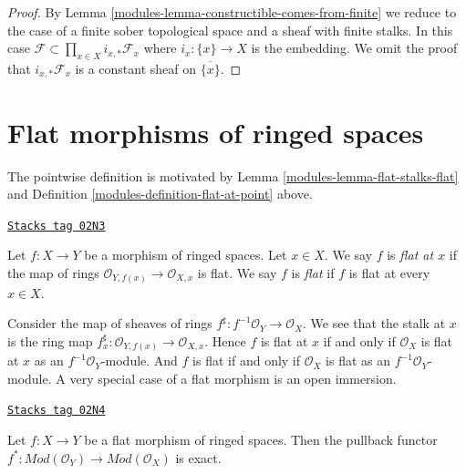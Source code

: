 \begin{proof}

By Lemma \ref{modules-lemma-constructible-comes-from-finite}
we reduce to the case of a finite sober topological space
and a sheaf with finite stalks.
In this case $\mathcal{F} \subset \prod_{x \in X} i_{x, *}\mathcal{F}_x$
where $i_x : \{x\} \to X$ is the embedding. We omit the proof
that $i_{x, *}\mathcal{F}_x$ is a constant sheaf on $\overline{\{x\}}$.
\end{proof}

\section{Flat morphisms of ringed spaces}
\label{modules-section-flat-morphisms}
The pointwise definition is motivated by
Lemma \ref{modules-lemma-flat-stalks-flat}
and
Definition \ref{modules-definition-flat-at-point}
above.

\begin{definition}
\label{modules-definition-flat-morphism}
\href{https://stacks.math.columbia.edu/tag/02N3}{\texttt{Stacks tag 02N3}}

Let $f : X \to Y$ be a morphism of ringed spaces.
Let $x \in X$. We say $f$ is {\it flat at $x$}
if the map of rings $\mathcal{O}_{Y, f(x)} \to \mathcal{O}_{X, x}$ is flat.
We say $f$ is {\it flat} if $f$ is flat at every $x \in X$.
\end{definition}

Consider the map of sheaves of rings
$f^\sharp : f^{-1}\mathcal{O}_Y \to \mathcal{O}_X$.
We see that the stalk at $x$ is the ring map
$f^\sharp_x : \mathcal{O}_{Y, f(x)} \to \mathcal{O}_{X, x}$.
Hence $f$ is flat at $x$ if and only if $\mathcal{O}_X$ is flat at $x$
as an $f^{-1}\mathcal{O}_Y$-module. And $f$ is flat if and only if
$\mathcal{O}_X$ is flat as an $f^{-1}\mathcal{O}_Y$-module.
A very special case of a flat morphism is an open immersion.

\begin{lemma}
\label{modules-lemma-pullback-flat}
\href{https://stacks.math.columbia.edu/tag/02N4}{\texttt{Stacks tag 02N4}}

Let $f : X \to Y$ be a flat morphism of ringed spaces.
Then the pullback functor
$f^* : \textit{Mod}(\mathcal{O}_Y) \to \textit{Mod}(\mathcal{O}_X)$
is exact.
\end{lemma}

